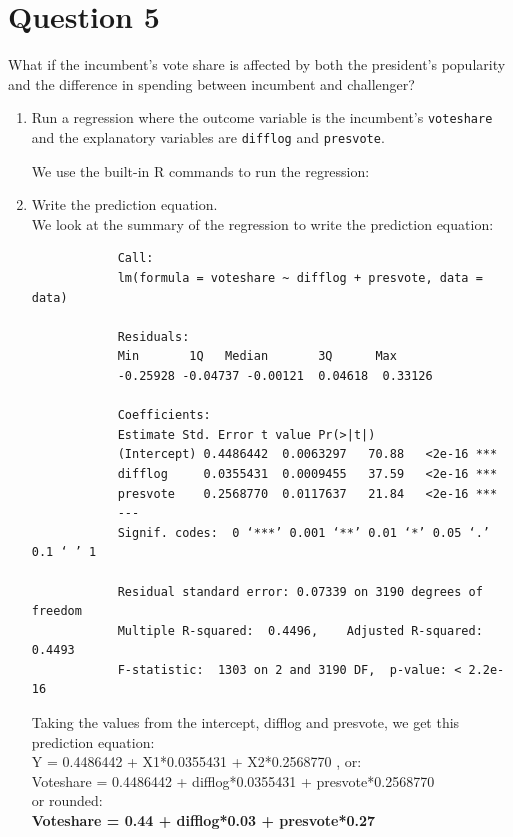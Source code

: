 \documentclass[12pt,letterpaper]{article}
\begin{document}
	\newpage	

\section*{Question 5}
\noindent What if the incumbent's vote share is affected by both the president's popularity and the difference in spending between incumbent and challenger? 
	\begin{enumerate}
		\item Run a regression where the outcome variable is the incumbent's \texttt{voteshare} and the explanatory variables are \texttt{difflog} and \texttt{presvote}.
		\vspace{.5cm}	
		
		We use the built-in R commands to run the regression:
		
		 
		\vspace{1cm}
		
		
		\item Write the prediction equation.
		\vspace{.5cm} \\
		We look at the summary of the regression to write the prediction equation:
		
		\begin{verbatim}
			Call:
			lm(formula = voteshare ~ difflog + presvote, data = data)
			
			Residuals:
			Min       1Q   Median       3Q      Max 
			-0.25928 -0.04737 -0.00121  0.04618  0.33126 
			
			Coefficients:
			Estimate Std. Error t value Pr(>|t|)    
			(Intercept) 0.4486442  0.0063297   70.88   <2e-16 ***
			difflog     0.0355431  0.0009455   37.59   <2e-16 ***
			presvote    0.2568770  0.0117637   21.84   <2e-16 ***
			---
			Signif. codes:  0 ‘***’ 0.001 ‘**’ 0.01 ‘*’ 0.05 ‘.’ 0.1 ‘ ’ 1
			
			Residual standard error: 0.07339 on 3190 degrees of freedom
			Multiple R-squared:  0.4496,	Adjusted R-squared:  0.4493 
			F-statistic:  1303 on 2 and 3190 DF,  p-value: < 2.2e-16
		\end{verbatim}
		Taking the values from the intercept, difflog and presvote, we get this prediction equation: \\
		Y = 0.4486442 + X1*0.0355431 + X2*0.2568770          , or:\\
		Voteshare = 0.4486442 + difflog*0.0355431 + presvote*0.2568770\\
		or rounded: \\
		\textbf{Voteshare = 0.44 + difflog*0.03 + presvote*0.27}	\\
		\vspace{.5cm} \\
		

\end{enumerate}
\end{document}
